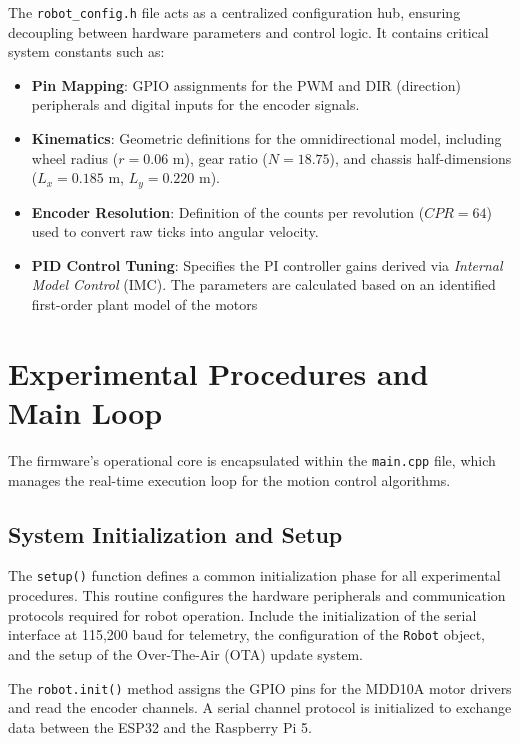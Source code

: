 The \texttt{robot\_config.h} file acts as a centralized configuration hub, ensuring decoupling between hardware parameters and control logic. It contains critical system constants such as:
\begin{itemize}
    \item \textbf{Pin Mapping}: GPIO assignments for the PWM and DIR (direction) peripherals and digital inputs for the encoder signals.
    \item \textbf{Kinematics}: Geometric definitions for the omnidirectional model, including wheel radius ($r = 0.06$ m), gear ratio ($N = 18.75$), and chassis half-dimensions ($L_x = 0.185$ m, $L_y = 0.220$ m).
    \item \textbf{Encoder Resolution}: Definition of the counts per revolution ($CPR = 64$) used to convert raw ticks into angular velocity.
    \item \textbf{PID Control Tuning}: Specifies the PI controller gains derived via \textit{Internal Model Control} (IMC). The parameters are calculated based on an identified first-order plant model of the motors 
\end{itemize}


\section{Experimental Procedures and Main Loop}

The firmware's operational core is encapsulated within the \texttt{main.cpp} file, which manages the real-time execution loop for the motion control algorithms.

\subsection{System Initialization and Setup}
The \texttt{setup()} function defines a common initialization phase for all experimental procedures. This routine configures the hardware peripherals and communication protocols required for robot operation. Include the initialization of the serial interface at 115,200 baud for telemetry, the configuration of the \texttt{Robot} object, and the setup of the Over-The-Air (OTA) update system.

The \texttt{robot.init()} method assigns the GPIO pins for the MDD10A motor drivers and read the encoder channels. A serial channel protocol is initialized to exchange data between the ESP32 and the Raspberry Pi 5.

